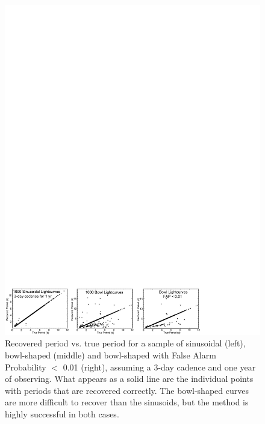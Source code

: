 \begin{figure}[b]
\begin{center}
 \includegraphics[width=5.32in]{figs/starFormation/tts1.pdf}
 \caption{Recovered period vs. true period for a sample of sinusoidal (left),
bowl-shaped (middle) and bowl-shaped with False Alarm Probability $<$ 0.01 (right),
assuming a 3-day cadence and one year of observing. What appears as a solid line are the
individual points with periods that are recovered correctly. The bowl-shaped curves are
more difficult to recover than the sinusoids, but the method is highly successful in both cases.}
   \label{tts1}
\end{center}
\end{figure}

